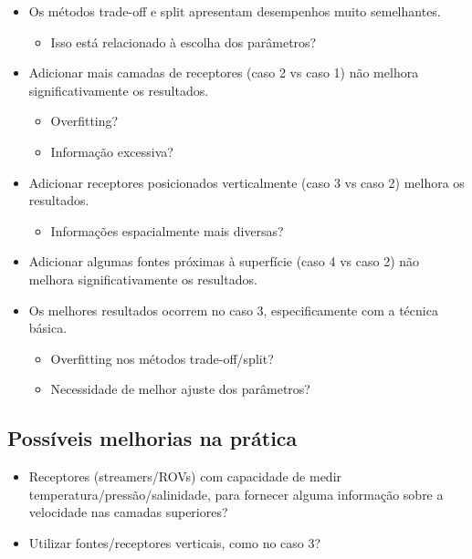\begin{itemize}
	\item Os métodos trade-off e split apresentam desempenhos muito semelhantes.
	\begin{itemize}
		\item Isso está relacionado à escolha dos parâmetros?
	\end{itemize}
	\item Adicionar mais camadas de receptores (caso 2 vs caso 1) não melhora significativamente os resultados.
	\begin{itemize}
		\item Overfitting?
		\item Informação excessiva?
	\end{itemize}
	\item Adicionar receptores posicionados verticalmente (caso 3 vs caso 2) melhora os resultados.
	\begin{itemize}
		\item Informações espacialmente mais diversas?
	\end{itemize}
	\item Adicionar algumas fontes próximas à superfície (caso 4 vs caso 2) não melhora significativamente os resultados.
	\item Os melhores resultados ocorrem no caso 3, especificamente com a técnica básica.
	\begin{itemize}
		\item Overfitting nos métodos trade-off/split?
		\item Necessidade de melhor ajuste dos parâmetros?
	\end{itemize}
\end{itemize}

\subsection{Possíveis melhorias na prática}
\begin{itemize}
	\item Receptores (streamers/ROVs) com capacidade de medir temperatura/pressão/salinidade, para fornecer alguma informação sobre a velocidade nas camadas superiores?
	\item Utilizar fontes/receptores verticais, como no caso 3?
\end{itemize}

